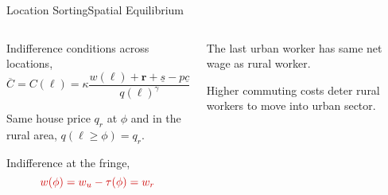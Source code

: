 \documentclass[aspectratio=169]{beamer}
\begin{document}
\begin{v75mins}
\begin{frame}{Location Sorting}{Spatial Equilibrium}
\begin{columns}
\begin{column}{0.5\textwidth}
\begin{midi}
 \item  Indifference conditions across locations,
\begin{equation*}
 \overline{C}=C(\ell)=\kappa\frac{w(\ell)+\mathbf{r}+ \underline{s} - p\underline{c}}{q(\ell)^{\gamma}}.
\end{equation*}
\item Same house price $q_r$ at $\phi$ and in the rural area, $q(\ell \geq \phi)=q_r$.
\item Indifference at the fringe,
\begin{equation*}
\re{w(\phi)=w_u -\tau(\phi)=w_r}
\end{equation*}
\end{midi} 
\end{column}		
\pause
\begin{column}{0.5\textwidth}

	\begin{midi}
		\item The last urban worker has same net wage as rural worker.
		\item Higher commuting costs deter rural workers to move into urban sector.
	\end{midi}
	
\end{column}


% 
\end{columns}

\end{frame}



\end{v75mins}
\end{document}

